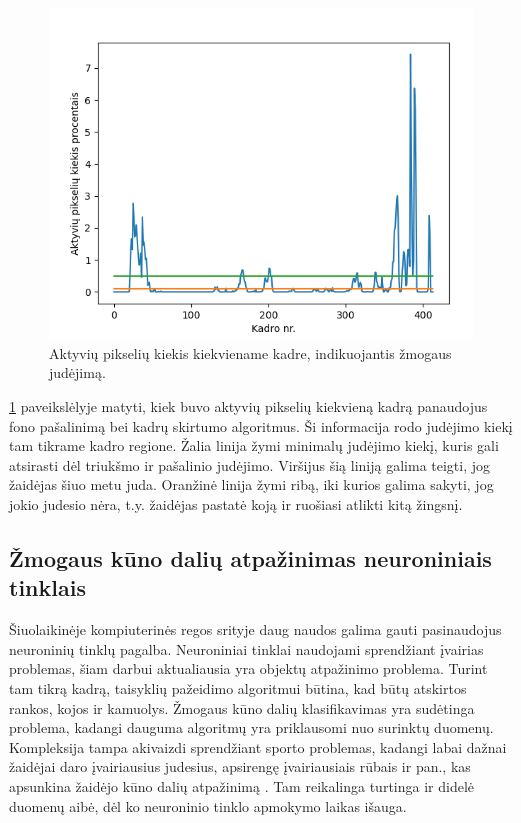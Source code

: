 \documentclass{VUMIFPSbakalaurinis}
\begin{document}
\begin{figure}[H]
    \centering
    \includegraphics[scale=0.8]{img/steps}
    \caption{Aktyvių pikselių kiekis kiekviename kadre, indikuojantis žmogaus judėjimą. }
    \label{img:steps}
\end{figure}

\ref{img:steps} paveikslėlyje matyti, kiek buvo aktyvių pikselių kiekvieną kadrą panaudojus fono pašalinimą bei kadrų skirtumo algoritmus. Ši informacija rodo judėjimo kiekį tam tikrame kadro regione. Žalia linija žymi minimalų judėjimo kiekį, kuris gali atsirasti dėl triukšmo ir pašalinio judėjimo. Viršijus šią liniją galima teigti, jog žaidėjas šiuo metu juda. Oranžinė linija žymi ribą, iki kurios galima sakyti, jog jokio judesio nėra, t.y. žaidėjas pastatė koją ir ruošiasi atlikti kitą žingsnį. 

\subsection{Žmogaus kūno dalių atpažinimas neuroniniais tinklais}

Šiuolaikinėje kompiuterinės regos srityje daug naudos galima gauti pasinaudojus neuroninių tinklų pagalba. Neuroniniai tinklai naudojami sprendžiant įvairias problemas, šiam darbui aktualiausia yra objektų atpažinimo problema. Turint tam tikrą kadrą, taisyklių pažeidimo algoritmui būtina, kad būtų atskirtos rankos, kojos ir kamuolys. Žmogaus kūno dalių klasifikavimas yra sudėtinga problema, kadangi dauguma algoritmų yra priklausomi nuo surinktų duomenų. Kompleksija tampa akivaizdi sprendžiant sporto problemas, kadangi labai dažnai žaidėjai daro įvairiausius judesius, apsirengę įvairiausiais rūbais ir pan., kas apsunkina žaidėjo kūno dalių atpažinimą \cite{Andriluka_2014_CVPR}. Tam reikalinga turtinga ir didelė duomenų aibė, dėl ko neuroninio tinklo apmokymo laikas išauga. 
\end{document}
